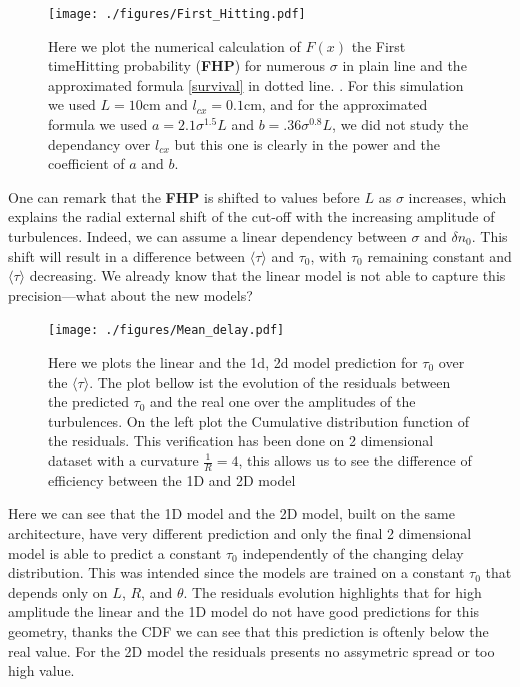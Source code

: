 \documentclass[11pt,a4paper,openany]{report}
\begin{document}
\begin{multicols}{2}
    \begin{figure}[H]
        \centering
        \hspace{-1.2cm}\texttt{[image: ./figures/First\_Hitting.pdf]}
        \label{fig:FHP}
        \caption{Here we plot the numerical calculation of $F(x)$ the First timeHitting probability (\textbf{FHP}) for numerous $\sigma$ in plain line  and the approximated formula \eqref{survival} in dotted line. . For this simulation we used $L = 10$cm and $l_{cx} = 0.1$cm, and for the approximated formula we used $a = 2.1 \sigma^{1.5}L$ and $b = .36\sigma^{0.8} L$, we did not study the dependancy over $l_{cx}$ but this one is clearly in the power and the coefficient of $a$ and $b$.}
    \end{figure}One can remark that the \textbf{FHP} is shifted to values before \( L \) as \( \sigma \) increases, which explains the radial external shift of the cut-off with the increasing amplitude of turbulences. Indeed, we can assume a linear dependency between \( \sigma \) and \( \delta n_0 \). This shift will result in a difference between \( \langle \tau \rangle \) and \( \tau_0 \), with \( \tau_0 \) remaining constant and \( \langle \tau \rangle \) decreasing. We already know that the linear model is not able to capture this precision—what about the new models?
    \begin{figure}[H]
        \centering
        \hspace*{-1.3cm}\texttt{[image: ./figures/Mean\_delay.pdf]}
        \label{}
        \caption{Here we plots the linear and the 1d, 2d model prediction for $\tau_0$ over the $\langle \tau \rangle$. The plot bellow ist the evolution of the residuals between the predicted $\tau_0$ and the real one over the amplitudes of the turbulences. On the left plot the Cumulative distribution function of the residuals. This verification has been done on 2 dimensional dataset with a curvature $\frac{1}{R} = 4$, this allows us to see the difference of efficiency between the 1D and 2D model}
    \end{figure}

    Here we can see that the 1D model and the 2D model, built on the same architecture, have very different prediction and only the final 2 dimensional model is able to predict a constant \(\tau_0\) independently of the changing delay distribution. This was intended since the models are trained on a constant \(\tau_0\) that depends only on \(L\), \(R\), and \(\theta\). The residuals evolution highlights that for high amplitude the linear and the 1D model do not have good predictions for this geometry, thanks the CDF we can see that this prediction is oftenly below the real value. For the 2D model the residuals presents no assymetric spread or too high value.


\end{multicols}
\end{document}
